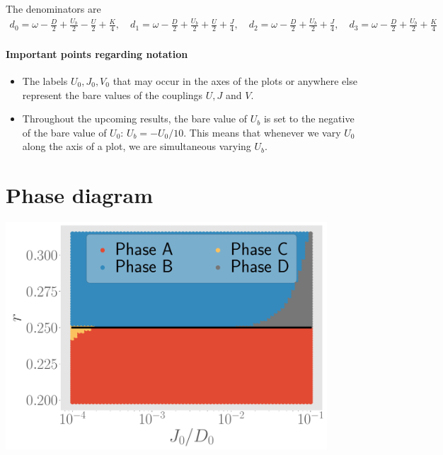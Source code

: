 The denominators are
\begin{equation}\begin{aligned}
	d_0 = \omega - \frac{D}{2} + \frac{U_b}{2} - \frac{U}{2} + \frac{K}{4}, \quad d_1 = \omega - \frac{D}{2} + \frac{U_b}{2} + \frac{U}{2} + \frac{J}{4}, \quad d_2 = \omega - \frac{D}{2} + \frac{U_b}{2} + \frac{J}{4}, \quad d_3 = \omega - \frac{D}{2} + \frac{U_b}{2} + \frac{K}{4}
\end{aligned}\end{equation}

\paragraph{Important points regarding notation}
\begin{itemize}
	\item The labels \(U_0,J_0,V_0\) that may occur in the axes of the plots or anywhere else represent the bare values of the couplings \(U,J\) and \(V\). 
	\item Throughout the upcoming results, the bare value of \(U_b\) is set to the negative of the bare value of \(U_0\): \(U_b = -U_0/10\). This means that whenever we vary \(U_0\) along the axis of a plot, we are simultaneous varying \(U_b\).	
\end{itemize}

\section{Phase diagram}

\begin{center}
	\includegraphics[width=0.9\textwidth]{../figures/phase-map-MIT.pdf}
\end{center}

